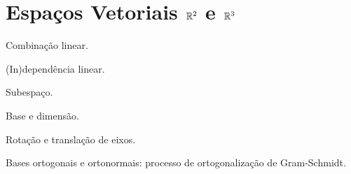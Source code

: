 \chapter{Espaços Vetoriais $\mathbb{R}^2$ e $\mathbb{R}^3$}

Combinação linear.

(In)dependência linear.

Subespaço.

Base e dimensão.

Rotação e translação de eixos.

Bases ortogonais e ortonormais: processo de ortogonalização de Gram-Schmidt.

